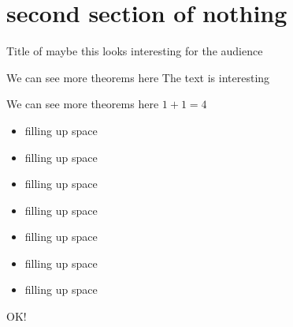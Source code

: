 \documentclass{beamer}
\begin{document}
\section{second section of nothing}
\begin{frame}{Title of maybe this looks interesting for the audience}

  \begin{block}{We can see more theorems here}
    The text is interesting
  \end{block}
  \begin{block}{We can see more theorems here}
    $1+1 = 4$
    \begin{itemize}
    \item filling up space
    \item filling up space
    \item filling up space
    \item filling up space
    \item filling up space
    \item filling up space
    \item filling up space
    \end{itemize}
    OK!
  \end{block}
  
\end{frame}
\end{document}
